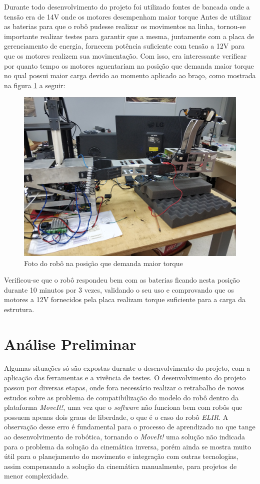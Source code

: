 Durante todo desenvolvimento do projeto foi utilizado fontes de bancada onde a tensão era de 14V onde os motores desempenham maior torque 
Antes de utilizar as baterias para que o robô pudesse realizar os movimentos na linha, tornou-se importante realizar testes para garantir que a mesma, juntamente com a placa de gerenciamento de energia, fornecem potência suficiente com tensão a 12V para que os motores realizem sua movimentação.
Com isso, era interessante verificar por quanto tempo os motores aguentariam na posição que demanda maior torque no qual possui maior carga devido ao momento aplicado ao braço, como mostrada na figura \ref{fig:robo_pior_pos} a seguir:
\begin{figure}[H]
	\centering
	\includegraphics[scale=0.08]{Figures/robo_pior_posicao.jpg}
	\caption{Foto do robô na posição que demanda maior torque}
	\label{fig:robo_pior_pos}
\end{figure}

Verificou-se que o robô respondeu bem com as baterias ficando nesta posição durante 10 minutos por 3 vezes, validando o seu uso e comprovando que os motores a 12V fornecidos pela placa realizam torque suficiente para a carga da estrutura.

\section{Análise Preliminar}\label{sec:anal_prem}

Algumas situações só são expostas durante o desenvolvimento do projeto, com a aplicação das ferramentas e a vivência de testes. O desenvolvimento do projeto passou por diversas etapas, onde fora necessário realizar o retrabalho de novos estudos sobre as problema de compatibilização do modelo do robô dentro da plataforma \textit{MoveIt!}, uma vez que o \textit{software} não funciona bem com robôs que possuem apenas dois graus de liberdade, o que é o caso do robô \textit{ELIR}. A observação desse erro é fundamental para o processo de aprendizado no que tange ao desenvolvimento de robótica, tornando o \textit{MoveIt!} uma solução não indicada para o problema da solução da cinemática inversa, porém ainda se mostra muito útil para o planejamento do movimento e integração com outras tecnologias, assim compensando a solução da cinemática manualmente, para projetos de menor complexidade.


